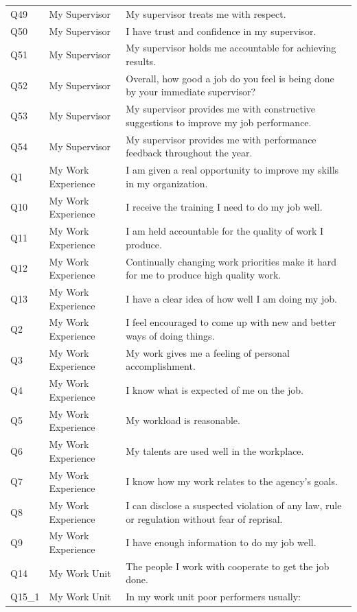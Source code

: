 \documentclass[
  man]{apa7}
\newenvironment{lltable}{\begin{landscape}\centering\begin{ThreePartTable}}{\end{ThreePartTable}\end{landscape}}
\begin{document}
\begin{lltable}
{\begin{longtable}{lll}
Q49 & My Supervisor & My supervisor treats me with respect.\\
Q50 & My Supervisor & I have trust and confidence in my supervisor.\\
Q51 & My Supervisor & My supervisor holds me accountable for achieving results.\\
Q52 & My Supervisor & Overall, how good a job do you feel is being done by your immediate supervisor?\\
Q53 & My Supervisor & My supervisor provides me with constructive suggestions to improve my job performance.\\
Q54 & My Supervisor & My supervisor provides me with performance feedback throughout the year.\\
Q1 & My Work Experience & I am given a real opportunity to improve my skills in my organization.\\
Q10 & My Work Experience & I receive the training I need to do my job well.\\
Q11 & My Work Experience & I am held accountable for the quality of work I produce.\\
Q12 & My Work Experience & Continually changing work priorities make it hard for me to produce high quality work.\\
Q13 & My Work Experience & I have a clear idea of how well I am doing my job.\\
Q2 & My Work Experience & I feel encouraged to come up with new and better ways of doing things.\\
Q3 & My Work Experience & My work gives me a feeling of personal accomplishment.\\
Q4 & My Work Experience & I know what is expected of me on the job.\\
Q5 & My Work Experience & My workload is reasonable.\\
Q6 & My Work Experience & My talents are used well in the workplace.\\
Q7 & My Work Experience & I know how my work relates to the agency's goals.\\
Q8 & My Work Experience & I can disclose a suspected violation of any law, rule or regulation without fear of reprisal.\\
Q9 & My Work Experience & I have enough information to do my job well.\\
Q14 & My Work Unit & The people I work with cooperate to get the job done.\\
Q15\_1 & My Work Unit & In my work unit poor performers usually:\\

\end{longtable}}
\end{lltable}
\end{document}
